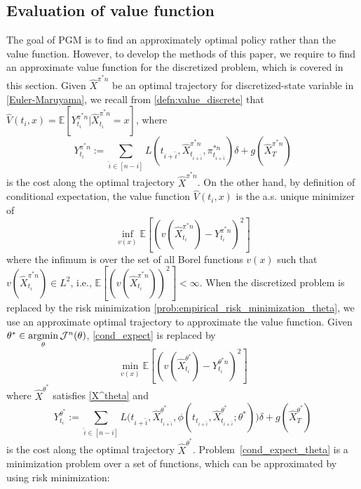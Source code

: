\documentclass{article}
\numberwithin{equation}{section}
\begin{document}
\subsection{Evaluation of value function}
The goal of PGM is to find an approximately optimal policy rather than the value function. However, to develop the methods of this paper, we require to find an approximate value function for the discretized problem, which is covered in this section. Given $\hat{X}^{\pi^*n}$ be an optimal trajectory for discretized-state variable in \eqref{Euler-Maruyama}, we recall from \eqref{defn:value_discrete} that 
$\hat{V}(t_i,x)=\mathbb{E}[Y^{\pi^*n}_{t_i}|\hat{X}^{\pi^*n}_{t_i}=x]$, where  
\begin{equation}
    Y^{\pi^{*}n}_{t_i}:=\sum_{\hat{i}\in[n-i]}L(t_{i+\hat{i}},\hat{X}^{\pi^{*}n}_{t_{i+\hat{i}}},\pi^{*n}_{t_{i+\hat{i}}})\delta + g(\hat{X}_T^{\pi^{*}n})
\end{equation}
is the cost along the optimal trajectory $\hat{X}^{\pi^*n}$. 
On the other hand, by definition of conditional expectation, the value function $\hat{V}(t_i,x)$ is the a.s. unique minimizer of 
\begin{equation}\label{cond_expect}
    \mathop{\inf}\limits_{v(x)}\mathbb{E}[(v(\hat{X}^{\pi^{*}n}_{t_i})-Y^{\pi^*n}_{t_i})^2]
\end{equation}
where the infimum is over the set of all Borel functions $v(x)$ such that $v(\hat{X}^{\pi^{*}n}_{t_i})\in L^2$, i.e., $\mathbb{E}[(v(\hat{X}^{\pi^{*}n}_{t_i}))^2]<\infty$.
When the discretized problem is replaced by the risk minimization \eqref{prob:empirical_risk_minimization_theta}, we use an approximate optimal trajectory to approximate the value function.
Given $\theta^*\in\mathop{\text{\normalfont argmin}}\limits_{\theta}{\mathcal{J}}^{n}(\theta)$,  \eqref{cond_expect} is replaced by 
\begin{equation}
    \mathop{\min}\limits_{v(x)}\mathbb{E}[(v(\hat{X}^{\theta^{*}}_{t_i})-Y^{\theta^*n}_{t_i})^2]
\end{equation}
where  $\hat{X}^{\theta^*}$ satisfies \eqref{X^theta} and
\begin{equation}\label{cond_expect_theta}
    Y^{\theta^{*}}_{t_i}:=\sum_{\hat{i}\in[n-i]}L\big(t_{i+\hat{i}},\hat{X}^{\theta^{*}}_{t_{i+\hat{i}}},\phi(t_{t_{i+\hat{i}}},\hat{X}^{\theta^*}_{t_{i+\hat{i}}};\theta^*)\big)\delta + g(\hat{X}_T^{\theta^{*}})
\end{equation}
is the cost along the optimal trajectory $\hat{X}^{\theta^*}$. 
Problem~\ref{cond_expect_theta} is a minimization problem over a set of functions, which can be approximated by using risk minimization:
\end{document}
